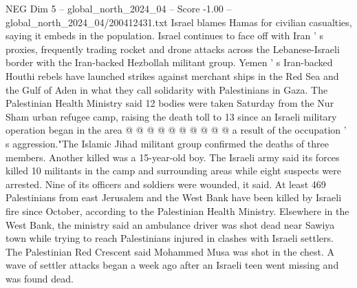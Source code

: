 \begin{textsample}{NEG Dim 5 – global\_north\_2024\_04 – Score -1.00 – global\_north\_2024\_04/200412431.txt}
Israel blames Hamas for civilian casualties, saying it embeds in the population.
Israel continues to face off with Iran ' s proxies, frequently trading rocket and drone attacks across the Lebanese-Israeli border with the Iran-backed Hezbollah militant group.
Yemen ' s Iran-backed Houthi rebels have launched strikes against merchant ships in the Red Sea and the Gulf of Aden in what they call solidarity with Palestinians in Gaza.
The Palestinian Health Ministry said 12 bodies were taken Saturday from the Nur Sham urban refugee camp, raising the death toll to 13 since an Israeli military operation began in the area @ @ @ @ @ @ @ @ @ @ a result of the occupation ' s aggression."The Islamic Jihad militant group confirmed the deaths of three members.
Another killed was a 15-year-old boy.
The Israeli army said its forces killed 10 militants in the camp and surrounding areas while eight suspects were arrested.
Nine of its officers and soldiers were wounded, it said.
At least 469 Palestinians from east Jerusalem and the West Bank have been killed by Israeli fire since October, according to the Palestinian Health Ministry.
Elsewhere in the West Bank, the ministry said an ambulance driver was shot dead near Sawiya town while trying to reach Palestinians injured in clashes with Israeli settlers.
The Palestinian Red Crescent said Mohammed Musa was shot in the chest.
A wave of settler attacks began a week ago after an Israeli teen went missing and was found dead.

\end{textsample}
